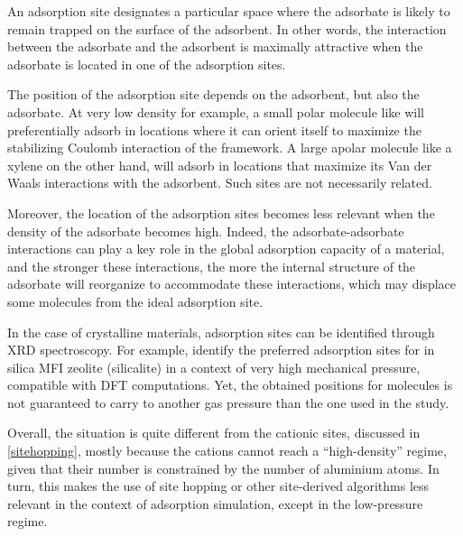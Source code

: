 \documentclass[main.tex]{subfiles}
\begin{document}
\label{adsorptionsites}


An adsorption site designates a particular space where the adsorbate is likely to remain trapped on the surface of the adsorbent. In other words, the interaction between the adsorbate and the adsorbent is maximally attractive when the adsorbate is located in one of the adsorption sites.

The position of the adsorption site depends on the adsorbent, but also the adsorbate. At very low density for example, a small polar molecule like  will preferentially adsorb in locations where it can orient itself to maximize the stabilizing Coulomb interaction of the framework. A large apolar molecule like a xylene on the other hand, will adsorb in locations that maximize its Van der Waals interactions with the adsorbent. Such sites are not necessarily related.

Moreover, the location of the adsorption sites becomes less relevant when the density of the adsorbate becomes high. Indeed, the adsorbate-adsorbate interactions can play a key role in the global adsorption capacity of a material, and the stronger these interactions, the more the internal structure of the adsorbate will reorganize to accommodate these interactions, which may displace some molecules from the ideal adsorption site.

In the case of crystalline materials, adsorption sites can be identified through XRD spectroscopy. For example, \textcite{CO2SitesInMFI} identify the preferred adsorption sites for  in silica MFI zeolite (silicalite) in a context of very high mechanical pressure, compatible with DFT computations. Yet, the obtained positions for  molecules is not guaranteed to carry to another gas pressure than the one used in the study.

Overall, the situation is quite different from the cationic sites, discussed in \cref{sitehopping}, mostly because the cations cannot reach a ``high-density'' regime, given that their number is constrained by the number of aluminium atoms. In turn, this makes the use of site hopping or other site-derived algorithms less relevant in the context of adsorption simulation, except in the low-pressure regime.
\end{document}

